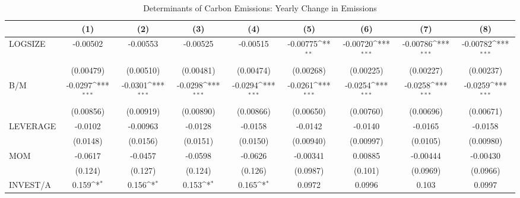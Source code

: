 \begin{table}[htbp]\centering
\def\sym#1{\ifmmode^{#1}\else\(^{#1}\)\fi}
\caption{Determinants of Carbon Emissions: Yearly Change in Emissions}
\begin{tabular}{l*{8}{c}}
\hline\hline
                    &\multicolumn{1}{c}{(1)}         &\multicolumn{1}{c}{(2)}         &\multicolumn{1}{c}{(3)}         &\multicolumn{1}{c}{(4)}         &\multicolumn{1}{c}{(5)}         &\multicolumn{1}{c}{(6)}         &\multicolumn{1}{c}{(7)}         &\multicolumn{1}{c}{(8)}         \\
\hline
LOGSIZE             &    -0.00502         &    -0.00553         &    -0.00525         &    -0.00515         &    -0.00775\sym{**} &    -0.00720\sym{***}&    -0.00786\sym{***}&    -0.00782\sym{***}\\
                    &   (0.00479)         &   (0.00510)         &   (0.00481)         &   (0.00474)         &   (0.00268)         &   (0.00225)         &   (0.00227)         &   (0.00237)         \\
B/M                 &     -0.0297\sym{***}&     -0.0301\sym{***}&     -0.0298\sym{***}&     -0.0294\sym{***}&     -0.0261\sym{***}&     -0.0254\sym{***}&     -0.0258\sym{***}&     -0.0259\sym{***}\\
                    &   (0.00856)         &   (0.00919)         &   (0.00890)         &   (0.00866)         &   (0.00650)         &   (0.00760)         &   (0.00696)         &   (0.00671)         \\
LEVERAGE            &     -0.0102         &    -0.00963         &     -0.0128         &     -0.0158         &     -0.0142         &     -0.0140         &     -0.0165         &     -0.0158         \\
                    &    (0.0148)         &    (0.0156)         &    (0.0151)         &    (0.0150)         &   (0.00940)         &   (0.00997)         &    (0.0105)         &   (0.00980)         \\
MOM                 &     -0.0617         &     -0.0457         &     -0.0598         &     -0.0626         &    -0.00341         &     0.00885         &    -0.00444         &    -0.00430         \\
                    &     (0.124)         &     (0.127)         &     (0.124)         &     (0.126)         &    (0.0987)         &     (0.101)         &    (0.0969)         &    (0.0966)         \\
INVEST/A            &       0.159\sym{*}  &       0.156\sym{*}  &       0.153\sym{*}  &       0.165\sym{*}  &      0.0972         &      0.0996         &       0.103         &      0.0997         \\

\end{tabular}
\end{table}

